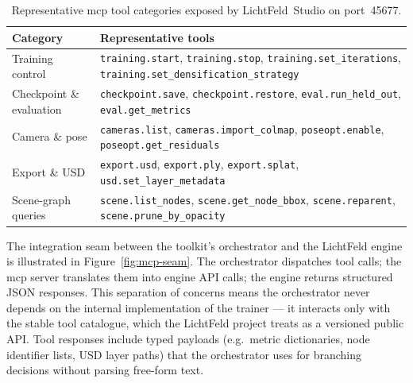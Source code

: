 \begin{table}[htbp]
  \centering
  \caption{Representative \acrshort{mcp} tool categories exposed by LichtFeld~Studio on port~45677.}
  \label{tab:mcp-tools}
  \small
  \begin{tabular}{@{}lp{8.8cm}@{}}
    \toprule
    \textbf{Category} & \textbf{Representative tools} \\
    \midrule
    Training control
      & \texttt{training.start}, \texttt{training.stop}, \texttt{training.set\_iterations},
        \texttt{training.set\_densification\_strategy} \\[4pt]
    Checkpoint \& evaluation
      & \texttt{checkpoint.save}, \texttt{checkpoint.restore},
        \texttt{eval.run\_held\_out}, \texttt{eval.get\_metrics} \\[4pt]
    Camera \& pose
      & \texttt{cameras.list}, \texttt{cameras.import\_colmap},
        \texttt{poseopt.enable}, \texttt{poseopt.get\_residuals} \\[4pt]
    Export \& USD
      & \texttt{export.usd}, \texttt{export.ply}, \texttt{export.splat},
        \texttt{usd.set\_layer\_metadata} \\[4pt]
    Scene-graph queries
      & \texttt{scene.list\_nodes}, \texttt{scene.get\_node\_bbox},
        \texttt{scene.reparent}, \texttt{scene.prune\_by\_opacity} \\
    \bottomrule
  \end{tabular}
\end{table}

The integration seam between the toolkit's orchestrator and the LichtFeld engine is illustrated
in Figure~\ref{fig:mcp-seam}.
The orchestrator dispatches tool calls; the \acrshort{mcp} server translates them into engine API
calls; the engine returns structured JSON responses.
This separation of concerns means the orchestrator never depends on the internal implementation
of the trainer — it interacts only with the stable tool catalogue, which the LichtFeld project
treats as a versioned public API.
Tool responses include typed payloads (e.g.\ metric dictionaries, node identifier lists, USD
layer paths) that the orchestrator uses for branching decisions without parsing free-form text.


